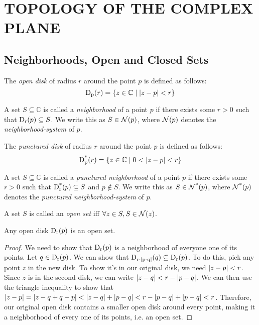 \section{TOPOLOGY OF THE COMPLEX PLANE}
\subsection{Neighborhoods, Open and Closed Sets}
\begin{definition}
The \emph{open disk} of radius $r$ around the point $p$ is defined as follows:
\begin{equation*}\disk{r}{p} = \{z \in \mathbb{C} \mid \modulus{z-p} < r\}\end{equation*}
\end{definition}
\begin{definition}
A set $S \subseteq \mathbb{C}$ is called a \emph{neighborhood} of a point $p$ if there exists some $r > 0$ such that $\disk{p}{r} \subseteq S$.
We write this as $S \in \nbhd{p}$, where $\nbhd{p}$ denotes the \emph{neighborhood-system} of $p$.
\end{definition}
\begin{definition}
The \emph{punctured disk} of radius $r$ around the point $p$ is defined as follows:
\begin{equation*}\pdisk{r}{p} = \{z \in \mathbb{C} \mid 0<\modulus{z-p} < r\}\end{equation*}
\end{definition}
\begin{definition}
A set $S \subseteq \mathbb{C}$ is called a \emph{punctured neighborhood} of a point $p$ if there exists some $r > 0$ such that $\pdisk{p}{r} \subseteq S$ and $p \notin S$.
We write this as $S \in \pnbhd{p}$, where $\pnbhd{p}$ denotes the \emph{punctured neighborhood-system} of $p$.
\end{definition}
\begin{definition}
A set $S$ is called an \emph{open set} iff $\forall z \in S, S \in \nbhd{z}$.
\end{definition}
\begin{lemma}
Any open disk $\disk{p}{r}$ is an open set.
\end{lemma}
\begin{proof}
We need to show that $\disk{p}{r}$ is a neighborhood of everyone one of its points. Let $q \in \disk{p}{r}$. We can show that $\disk{q}{r-\modulus{p-q}} \subseteq \disk{p}{r}$. To do this, pick any point $z$ in the new disk. To show it's in our original disk, we need $\modulus{z-p} < r$. Since $z$ is in the second disk, we can write $\modulus{z-q} < r-\modulus{p-q}$. We can then use the triangle inequality to show that $\modulus{z-p} = \modulus{z-q+q-p} < \modulus{z-q}+\modulus{p-q} < r-\modulus{p-q}+\modulus{p-q} < r$. Therefore, our original open disk contains a smaller open disk around every point, making it a neighborhood of every one of its points, i.e. an open set.
\end{proof}

